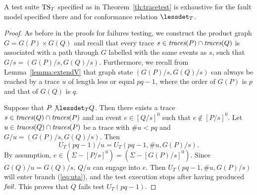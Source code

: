 \begin{lemma}\label{lemma:mainfexhaustivetrace}
A test suite ${\text{TS}}_T$ specified as in Theorem~\ref{th:tracetest} is
exhaustive for the fault model specified there and for conformance relation $\lessdet_T$.
\end{lemma}
\begin{proof}
As before in the proofs for
failures testing, we construct the product graph $G=G(P)\times G(Q)$ and recall
that every trace $s\in\text{\it traces}(P)\cap\text{\it traces}(Q)$ is associated with a path through $G$ labelled
with the same events as $s$, such that $G/s = (G(P)/s,G(Q)/s)$. Furthermore, we recall from Lemma~\ref{lemma:extendV} that graph state $(G(P)/s,G(Q)/s)$ can always be
reached by a trace $u$ of length less or equal $pq-1$, where  the order of $G(P)$ is $p$ and that of $G(Q)$ is $q$.


Suppose that $P\not\lessdet_T Q$. Then there exists a trace $s\in \text{\it traces}(Q)\cap\text{\it traces}(P)$ and an event $e\in [Q/s]^0$ such that $e\not\in [P/s]^0$. Let $u\in \text{\it traces}(Q)\cap\text{\it traces}(P)$
be a trace with $\#u < pq$ and $G/u = (G(P)/s,G(Q)/s)$. Then 
$$
U_T(pq-1)/u = U_T(pq-1,\#u,G(P)/s).
$$ 
By assumption, 
$e\in (\Sigma -[P/s]^0) = (\Sigma - [G(P)/s]^0)$. 
Since  $G(Q)/u = G(Q)/s$,
 $Q/u$ can engage into $e$. Then $U_T(pq-1,\#u,G(P)/s)$ will enter branch (\ref{eq:uta}), and the test execution stops after having produced ${\text{\it fail}}$. This proves that
  $Q$  fails test $U_T(pq-1)$.
\xbox
\end{proof}

























 
 
